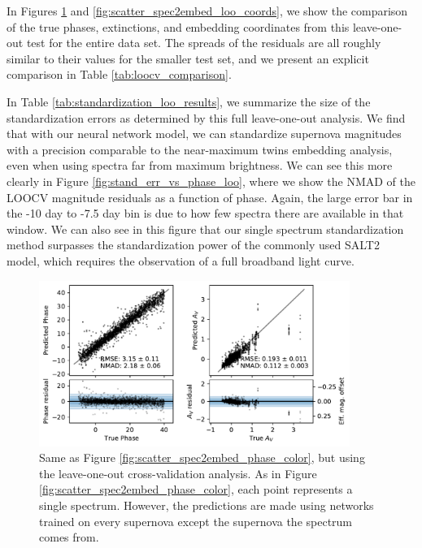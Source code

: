 In Figures \ref{fig:scatter_spec2embed_loo_phase_color} and \ref{fig:scatter_spec2embed_loo_coords}, we show the comparison of the true phases, extinctions, and embedding coordinates from this leave-one-out test for the entire data set. The spreads of the residuals are all roughly similar to their values for the smaller test set, and we present an explicit comparison in Table \ref{tab:loocv_comparison}.

In Table \ref{tab:standardization_loo_results}, we summarize the size of the standardization errors as determined by this full leave-one-out analysis. We find that with our neural network model, we can standardize supernova magnitudes with a precision comparable to the near-maximum twins embedding analysis, even when using spectra far from maximum brightness. We can see this more clearly in Figure \ref{fig:stand_err_vs_phase_loo}, where we show the NMAD of the LOOCV magnitude residuals as a function of phase. Again, the large error bar in the -10 day to -7.5 day bin is due to how few spectra there are available in that window. We can also see in this figure that our single spectrum standardization method surpasses the standardization power of the commonly used SALT2 model, which requires the observation of a full broadband light curve.  

\begin{figure}
    \centering
    \includegraphics[width=0.9\textwidth]{figures/nn_twins/scatter_loo_spec2embed_phase_color_mag.pdf}
    \caption{Same as Figure \ref{fig:scatter_spec2embed_phase_color}, but using the leave-one-out cross-validation analysis. As in Figure \ref{fig:scatter_spec2embed_phase_color}, each point represents a single spectrum. However, the predictions are made using networks trained on every supernova except the supernova the spectrum comes from.}
    \label{fig:scatter_spec2embed_loo_phase_color}
\end{figure}

